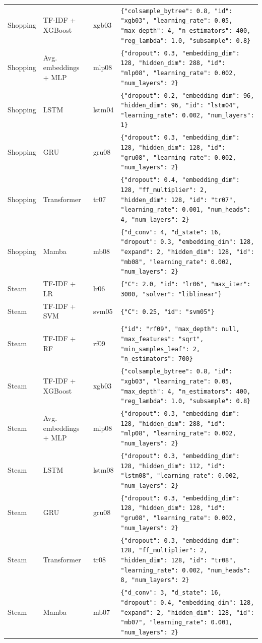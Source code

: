 \begin{longtable}{lll >{\raggedright\arraybackslash}p{7.2cm}}
Shopping & TF-IDF + XGBoost & xgb03 & \texttt{\{"colsample\_bytree": 0.8, "id": "xgb03", "learning\_rate": 0.05, "max\_depth": 4, "n\_estimators": 400, "reg\_lambda": 1.0, "subsample": 0.8\}} \\
Shopping & Avg. embeddings + MLP & mlp08 & \texttt{\{"dropout": 0.3, "embedding\_dim": 128, "hidden\_dim": 288, "id": "mlp08", "learning\_rate": 0.002, "num\_layers": 2\}} \\
Shopping & LSTM & lstm04 & \texttt{\{"dropout": 0.2, "embedding\_dim": 96, "hidden\_dim": 96, "id": "lstm04", "learning\_rate": 0.002, "num\_layers": 1\}} \\
Shopping & GRU & gru08 & \texttt{\{"dropout": 0.3, "embedding\_dim": 128, "hidden\_dim": 128, "id": "gru08", "learning\_rate": 0.002, "num\_layers": 2\}} \\
Shopping & Transformer & tr07 & \texttt{\{"dropout": 0.4, "embedding\_dim": 128, "ff\_multiplier": 2, "hidden\_dim": 128, "id": "tr07", "learning\_rate": 0.001, "num\_heads": 4, "num\_layers": 2\}} \\
Shopping & Mamba & mb08 & \texttt{\{"d\_conv": 4, "d\_state": 16, "dropout": 0.3, "embedding\_dim": 128, "expand": 2, "hidden\_dim": 128, "id": "mb08", "learning\_rate": 0.002, "num\_layers": 2\}} \\
Steam & TF-IDF + LR & lr06 & \texttt{\{"C": 2.0, "id": "lr06", "max\_iter": 3000, "solver": "liblinear"\}} \\
Steam & TF-IDF + SVM & svm05 & \texttt{\{"C": 0.25, "id": "svm05"\}} \\
Steam & TF-IDF + RF & rf09 & \texttt{\{"id": "rf09", "max\_depth": null, "max\_features": "sqrt", "min\_samples\_leaf": 2, "n\_estimators": 700\}} \\
Steam & TF-IDF + XGBoost & xgb03 & \texttt{\{"colsample\_bytree": 0.8, "id": "xgb03", "learning\_rate": 0.05, "max\_depth": 4, "n\_estimators": 400, "reg\_lambda": 1.0, "subsample": 0.8\}} \\
Steam & Avg. embeddings + MLP & mlp08 & \texttt{\{"dropout": 0.3, "embedding\_dim": 128, "hidden\_dim": 288, "id": "mlp08", "learning\_rate": 0.002, "num\_layers": 2\}} \\
Steam & LSTM & lstm08 & \texttt{\{"dropout": 0.3, "embedding\_dim": 128, "hidden\_dim": 112, "id": "lstm08", "learning\_rate": 0.002, "num\_layers": 2\}} \\
Steam & GRU & gru08 & \texttt{\{"dropout": 0.3, "embedding\_dim": 128, "hidden\_dim": 128, "id": "gru08", "learning\_rate": 0.002, "num\_layers": 2\}} \\
Steam & Transformer & tr08 & \texttt{\{"dropout": 0.3, "embedding\_dim": 128, "ff\_multiplier": 2, "hidden\_dim": 128, "id": "tr08", "learning\_rate": 0.002, "num\_heads": 8, "num\_layers": 2\}} \\
Steam & Mamba & mb07 & \texttt{\{"d\_conv": 3, "d\_state": 16, "dropout": 0.4, "embedding\_dim": 128, "expand": 2, "hidden\_dim": 128, "id": "mb07", "learning\_rate": 0.001, "num\_layers": 2\}} \\
\bottomrule
\end{longtable}
